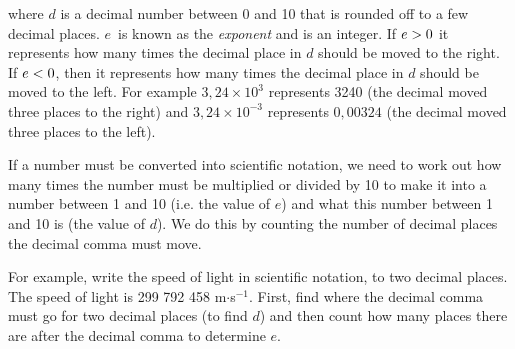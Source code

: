         
        \label{m30853*id64634}where \begin{math}d\end{math} is a decimal number between 0 and 10 that is rounded off to a few decimal places. \begin{math}e\end{math}~is known as the \textsl{exponent} and is an integer.
If \begin{math}e>{}0\end{math} it represents how many times the decimal place in \begin{math}d\end{math} should be moved to the right. If \begin{math}e<{}0\end{math}, then it represents how many times the decimal place in \begin{math}d\end{math} should be moved to the left. For example \begin{math}3,24\ensuremath{\times}{10}^{3}\end{math} represents 3240 (the decimal moved three places to the right) and \begin{math}3,24\ensuremath{\times}{10}^{-3}\end{math} represents \begin{math}0,00324\end{math} (the decimal moved three places to the left).\par 
        \label{m30853*id64777}If a number must be converted into scientific notation, we need to work out how many times the number must be multiplied or divided by 10 to make it into a number between 1 and 10 (i.e. the value of \begin{math}e\end{math}) and what this number between 1 and 10 is (the value of \begin{math}d\end{math}). We do this by counting the number of decimal places the decimal comma must move.\par 
        \label{m30853*id64801}For example, write the speed of light in scientific notation, to two decimal places. The speed of light is 299 792 458 m\begin{math}\ensuremath{\cdot}\end{math}s\begin{math}{}^{-1}\end{math}. First, find where the decimal comma must go for two decimal places (to find \begin{math}d\end{math}) and then count how many places there are after the decimal comma to determine \begin{math}e\end{math}.\par 
